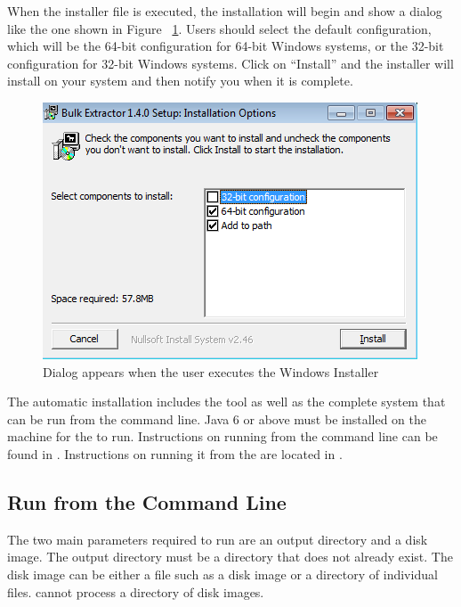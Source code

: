 \documentclass[11pt]{article} %
\begin{document}
When the installer file is executed, the installation will begin and show a dialog like the one shown in Figure ~\ref{fig:installer1}.  Users should select the default configuration, which will be the 64-bit configuration for 64-bit Windows systems, or the 32-bit configuration for 32-bit Windows systems.  Click on ``Install'' and the installer will install \bulk on your system and then notify you when it is complete.\\
\begin{figure}
	\center
	\includegraphics[scale=.70]{installPics/installer1.png}
	\caption{Dialog appears when the user executes the Windows Installer}
	\label{fig:installer1}
\end{figure}


The automatic installation includes the \viewer tool as well as the complete \bulk system that can be run from the command line. Java 6 or above must  be installed on the machine for the \viewer to run. Instructions on running \bulk from the command line can be found in  \textbf{}. Instructions on running it from the \viewer are located in \textbf{}. \\

\subsection {Run \bulk from the Command Line}
\label{RunFromCommandLine}
The two main parameters required to run \bulk are an output directory and a disk image. The output directory must be a directory that does not already exist. The disk image can be either a file such as a disk image or a directory of individual files. \bulk cannot process a directory of disk images.\\
\end{document}
